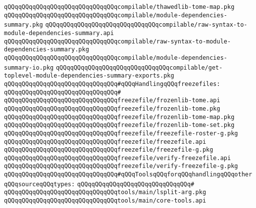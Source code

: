 \verb|qQQqqQQqqQQqqQQqqQQqqQQqqQQqqQQqcompilable/thawedlib-tome-map.pkg|\newline
\verb|qQQqqQQqqQQqqQQqqQQqqQQqqQQqqQQqcompilable/module-dependencies-summary.pkg|\newline
\verb|qQQqqQQqqQQqqQQqqQQqqQQqqQQqqQQqcompilable/raw-syntax-to-module-dependencies-summary.api|\newline
\verb|qQQqqQQqqQQqqQQqqQQqqQQqqQQqqQQqcompilable/raw-syntax-to-module-dependencies-summary.pkg|\newline
\verb|qQQqqQQqqQQqqQQqqQQqqQQqqQQqqQQqcompilable/module-dependencies-summary-io.pkg|\newline
\verb|qQQqqQQqqQQqqQQqqQQqqQQqqQQqqQQqcompilable/get-toplevel-module-dependencies-summary-exports.pkg|\newline
\newline
\verb|qQQqqQQqqQQqqQQqqQQqqQQqqQQqqQQq#qQQqHandlingqQQqfreezefiles:|\newline
\verb|qQQqqQQqqQQqqQQqqQQqqQQqqQQqqQQq#|\newline
\verb|qQQqqQQqqQQqqQQqqQQqqQQqqQQqqQQqfreezefile/frozenlib-tome.api|\newline
\verb|qQQqqQQqqQQqqQQqqQQqqQQqqQQqqQQqfreezefile/frozenlib-tome.pkg|\newline
\verb|qQQqqQQqqQQqqQQqqQQqqQQqqQQqqQQqfreezefile/frozenlib-tome-map.pkg|\newline
\verb|qQQqqQQqqQQqqQQqqQQqqQQqqQQqqQQqfreezefile/frozenlib-tome-set.pkg|\newline
\verb|qQQqqQQqqQQqqQQqqQQqqQQqqQQqqQQqfreezefile/freezefile-roster-g.pkg|\newline
\verb|qQQqqQQqqQQqqQQqqQQqqQQqqQQqqQQqfreezefile/freezefile.api|\newline
\verb|qQQqqQQqqQQqqQQqqQQqqQQqqQQqqQQqfreezefile/freezefile-g.pkg|\newline
\verb|qQQqqQQqqQQqqQQqqQQqqQQqqQQqqQQqfreezefile/verify-freezefile.api|\newline
\verb|qQQqqQQqqQQqqQQqqQQqqQQqqQQqqQQqfreezefile/verify-freezefile-g.pkg|\newline
\newline
\verb|qQQqqQQqqQQqqQQqqQQqqQQqqQQqqQQq#qQQqToolsqQQqforqQQqhandlingqQQqotherqQQqsourceqQQqtypes:|\newline
\verb|qQQqqQQqqQQqqQQqqQQqqQQqqQQqqQQq#|\newline
\verb|qQQqqQQqqQQqqQQqqQQqqQQqqQQqqQQqtools/main/lsplit-arg.pkg|\newline
\verb|qQQqqQQqqQQqqQQqqQQqqQQqqQQqqQQqtools/main/core-tools.api|\newline
